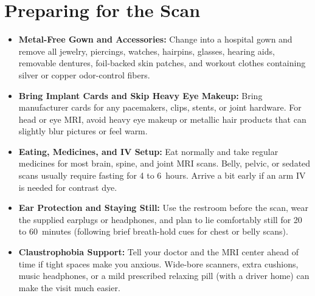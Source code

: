 \section{Preparing for the Scan}
\begin{itemize}
\item \textbf{Metal-Free Gown and Accessories:} Change into a hospital gown and remove all jewelry, piercings, watches, hairpins, glasses, hearing aids, removable dentures, foil-backed skin patches, and workout clothes containing silver or copper odor-control fibers.
\item \textbf{Bring Implant Cards and Skip Heavy Eye Makeup:} Bring manufacturer cards for any pacemakers, clips, stents, or joint hardware. For head or eye MRI, avoid heavy eye makeup or metallic hair products that can slightly blur pictures or feel warm.
\item \textbf{Eating, Medicines, and IV Setup:} Eat normally and take regular medicines for most brain, spine, and joint MRI scans. Belly, pelvic, or sedated scans usually require fasting for 4 to 6~hours. Arrive a bit early if an arm IV is needed for contrast dye.
\item \textbf{Ear Protection and Staying Still:} Use the restroom before the scan, wear the supplied earplugs or headphones, and plan to lie comfortably still for 20 to 60~minutes (following brief breath-hold cues for chest or belly scans).
\item \textbf{Claustrophobia Support:} Tell your doctor and the MRI center ahead of time if tight spaces make you anxious. Wide-bore scanners, extra cushions, music headphones, or a mild prescribed relaxing pill (with a driver home) can make the visit much easier.
\end{itemize}


